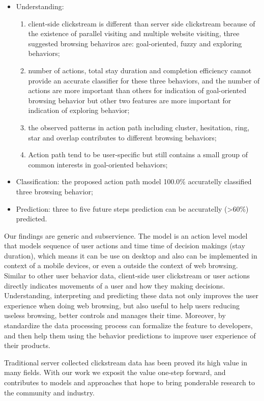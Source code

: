 \begin{itemize}
    \item Understanding: 
        \begin{enumerate}
            \item client-side clickstream is different than server side clickstream because of the existence of
            parallel visiting and multiple website visiting, three suggested browsing behaviros are: goal-oriented, fuzzy and exploring behaviors;
            \item number of actions, total stay duration and completion efficiency cannot provide an accurate classifier for these three behaviors, 
            and the number of actions are more important than others for indication of goal-oriented browsing behavior but other two features are more important for indication of exploring behavior;
            \item the observed patterns in action path including cluster, hesitation, ring, star and overlap contributes to different browsing behaviors;
            \item Action path tend to be user-specific but still contains a small group of common interests in goal-oriented behaviors;
        \end{enumerate}
    \item Classification: the proposed action path model 100.0\% accuratelly classified three browsing behavior;
    \item Prediction: three to five future steps prediction can be accuratelly (>60\%) predicted.
\end{itemize}

Our findings are generic and subservience. The model is an action level model that models
sequence of user actions and time time of decision makings (stay duration), which means it
can be use on desktop and also can be implemented in context of a mobile devices, 
or even a outside the context of web browsing.
Similar to other user behavior data, client-side user clickstream or user actions 
directly indicates movements of a user and how they making decisions. Understanding, 
interpreting and predicting these data not only improves the user experience when doing
web browsing, but also useful to help users reducing useless browsing, better controls 
and manages their time. Moreover, by standardize the data processing process can formalize
the feature to developers, and then help them using the behavior predictions to
improve user experience of their products.

Traditional server collected clickstream data has been proved its high value in many 
fields. With our work we exposit the value one-step forward, and contributes to models 
and approaches that hope to bring ponderable research to the community and industry.

\cleardoublepage